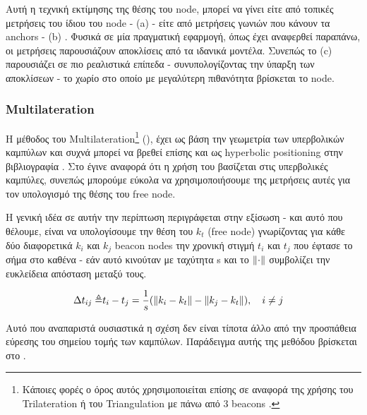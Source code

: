 Αυτή η τεχνική εκτίμησης της θέσης του node, μπορεί να γίνει είτε από τοπικές μετρήσεις του ίδιου του node -
 (a) - είτε από μετρήσεις γωνιών που κάνουν τα anchors -  (b)
\cite{wsn-Localization-systems}. Φυσικά σε μία πραγματική εφαρμογή, όπως έχει αναφερθεί παραπάνω, οι μετρήσεις παρουσιάζουν αποκλίσεις 
από τα ιδανικά μοντέλα. Συνεπώς το  (c) παρουσιάζει σε πιο ρεαλιστικά επίπεδα - συνυπολογίζοντας την ύπαρξη 
των αποκλίσεων - 
το χωρίο στο οποίο με μεγαλύτερη πιθανότητα βρίσκεται το node.

\subsubsection{Multilateration} \label{sec:Multilateration}
Η μέθοδος του Multilateration\footnote{Κάποιες φορές ο όρος αυτός χρησιμοποιείται επίσης σε αναφορά της χρήσης του Trilateration ή του Triangulation με πάνω από 3 beacons \cite{wsn-Localization-systems} \cite{triangulation-simple-equation}.} (), 
έχει ως βάση την γεωμετρία των υπερβολικών καμπύλων και συχνά μπορεί να βρεθεί επίσης και ως hyperbolic positioning 
στην βιβλιογραφία \cite{multilateration-def} \cite{triangulation-trilateration-multilateration} \cite{wikipedia-multilateration}. Στο  
έγινε αναφορά ότι η χρήση του  βασίζεται στις υπερβολικές καμπύλες, συνεπώς μπορούμε εύκολα να χρησιμοποιήσουμε
της μετρήσεις αυτές για τον υπολογισμό της θέσης του free node.

Η γενική ιδέα σε αυτήν την περίπτωση περιγράφεται στην εξίσωση  \cite{wsn-Localization-techniques} \cite{simple-tdoa} - και αυτό που 
θέλουμε, είναι να υπολογίσουμε την θέση του $k_t$ (free node) γνωρίζοντας για κάθε δύο διαφορετικά $k_i$ και $k_j$ beacon nodes
την χρονική στιγμή $t_i$ και $t_j$ που έφτασε το σήμα στο καθένα - εάν αυτό κινούταν με ταχύτητα s και το $\left\lVert\cdot\right\rVert$ συμβολίζει την ευκλείδεια
απόσταση μεταξύ τους.

\begin{align}
	\Delta t_{ij} \triangleq & t_i - t_j = \frac{1}{s} (\left\lVert k_i - k_t\right\rVert - \left\lVert k_j - k_t\right\rVert), \quad i \neq j\label{eq:tdoa-multiple}
\end{align}

Αυτό που αναπαριστά ουσιαστικά η σχέση  δεν είναι τίποτα άλλο από την προσπάθεια εύρεσης του σημείου τομής των καμπύλων.
Παράδειγμα αυτής της μεθόδου βρίσκεται στο .

